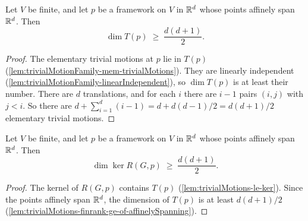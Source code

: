 \begin{lemma}
  \label{lem:trivialMotions-finrank-ge-of-affinelySpanning}
  \leanok
  Let $V$ be finite, and let $p$ be a framework on $V$ in ${\mathbb{R}}^{d}$
  whose points affinely span ${\mathbb{R}}^{d}$. Then
  \[
    \dim T(p) \;\ge\; \frac{d(d+1)}{2}.
  \]
\end{lemma}
\begin{proof}
  \leanok
  The elementary trivial motions at $p$ lie in $T(p)$
  (\cref{lem:trivialMotionFamily-mem-trivialMotions}). They are
  linearly independent (\cref{lem:trivialMotionFamily-linearIndependent}),
  so $\dim T(p)$ is at least their number. There are $d$ translations,
  and for each $i$ there are $i - 1$ pairs $(i, j)$ with $j < i$. So
  there are $d + \sum_{i=1}^{d} (i - 1) = d + d(d-1)/2 = d(d+1)/2$
  elementary trivial motions.
\end{proof}

\begin{lemma}
  \label{lem:rigidityMap-ker-finrank-ge-of-affinelySpanning}
  \leanok
  Let $V$ be finite, and let $p$ be a framework on $V$ in ${\mathbb{R}}^{d}$
  whose points affinely span ${\mathbb{R}}^{d}$. Then
  \[
    \dim \ker R(G, p) \;\ge\; \frac{d(d+1)}{2}.
  \]
\end{lemma}
\begin{proof}
  \leanok
  The kernel of $R(G, p)$ contains $T(p)$
  (\cref{lem:trivialMotions-le-ker}). Since the points affinely span
  ${\mathbb{R}}^{d}$, the dimension of $T(p)$ is at least $d(d+1)/2$
  (\cref{lem:trivialMotions-finrank-ge-of-affinelySpanning}).
\end{proof}
